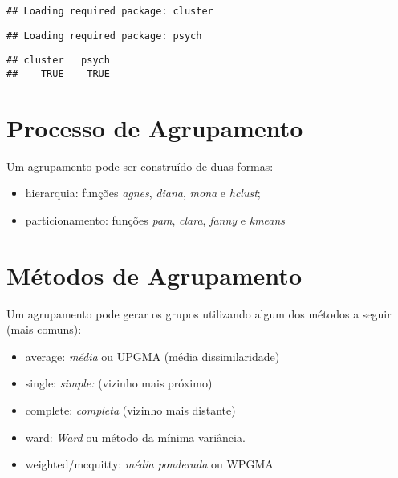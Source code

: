 \documentclass[]{book}
\newenvironment{Shaded}{\begin{snugshade}}{\end{snugshade}}
\newcommand{\KeywordTok}[1]{\textcolor[rgb]{0.13,0.29,0.53}{\textbf{{#1}}}}
\newcommand{\DataTypeTok}[1]{\textcolor[rgb]{0.13,0.29,0.53}{{#1}}}
\newcommand{\DecValTok}[1]{\textcolor[rgb]{0.00,0.00,0.81}{{#1}}}
\newcommand{\StringTok}[1]{\textcolor[rgb]{0.31,0.60,0.02}{{#1}}}
\newcommand{\NormalTok}[1]{{#1}}
\providecommand{\tightlist}{%
  \setlength{\itemsep}{0pt}\setlength{\parskip}{0pt}}
\begin{document}
\begin{verbatim}
## Loading required package: cluster
\end{verbatim}

\begin{verbatim}
## Loading required package: psych
\end{verbatim}

\begin{verbatim}
## cluster   psych 
##    TRUE    TRUE
\end{verbatim}

\begin{Shaded}
\end{Shaded}

\section{Processo de Agrupamento}\label{AAprocess}

Um agrupamento pode ser construído de duas formas:

\begin{itemize}
\tightlist
\item
  hierarquia: funções \emph{agnes}, \emph{diana}, \emph{mona} e
  \emph{hclust};
\item
  particionamento: funções \emph{pam}, \emph{clara}, \emph{fanny} e
  \emph{kmeans}
\end{itemize}

\section{Métodos de Agrupamento}\label{AAmethod}

Um agrupamento pode gerar os grupos utilizando algum dos métodos a
seguir (mais comuns):

\begin{itemize}
\tightlist
\item
  average: \emph{média} ou UPGMA (média dissimilaridade)
\item
  single: \emph{simple:} (vizinho mais próximo)
\item
  complete: \emph{completa} (vizinho mais distante)
\item
  ward: \emph{Ward} ou método da mínima variância.
\item
  weighted/mcquitty: \emph{média ponderada} ou WPGMA
\end{itemize}
\end{document}
